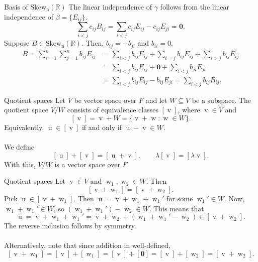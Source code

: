 \documentclass{beamer}
\def\Skew{\operatorname{Skew_n(\mathbb{R})}}
\def\u{\operatorname{u}}
\def\v{\operatorname{v}}
\def\w{\operatorname{w}}
\begin{document}
        \begin{frame}{Basis of $\Skew$}
                The linear independence of $\gamma$ follows from the linear independence of $\beta = \{E_{ij}\}$.
                \[
                        \sum_{i < j} c_{ij}B_{ij} = \sum_{i < j} c_{ij} E_{ij} - c_{ij}E_{ji} = \mathbf{0}.
                \]
                \pause
                Suppose $B \in \Skew$. Then, $b_{ij} = -b_{ji}$ and $b_{ii} = 0$.
                \begin{align*}
                        B = \sum_{i = 1}^n \sum_{j = 1}^n b_{ij}E_{ij} 
                                &= \sum_{i < j} b_{ij}E_{ij} + \sum_{i = j}b_{ij}E_{ij} + \sum_{i > j} b_{ij}E_{ij} \\
                                &= \sum_{i < j} b_{ij}E_{ij} + \mathbf{0} + \sum_{i < j} b_{ji}E_{ji} \\
                                &= \sum_{i < j} b_{ij}E_{ij} - b_{ij}E_{ji} = \sum_{i < j} b_{ij}B_{ij}.
                \end{align*}
        \end{frame}

        \begin{frame}{Quotient spaces}
                Let $V$ be vector space over $F$ and let $W\subseteq V$ be a subspace.
                The quotient space $V/W$ consists of equivalence classes $[\v]$, where $\v \in V$ and
                \[
                        [\v] = \v + W = \{\v + \w\colon \w \in W\}.
                \]
                Equivalently, $\u \in [\v]$ if and only if $\u - \v \in W$. \\~\\
                \pause
                We define
                \[
                        [\u] + [\v] = [\u + \v], \qquad \lambda[\v] = [\lambda\v].
                \]
                With this, $V/W$ is a vector space over $F$.
        \end{frame}
        
        \begin{frame}{Quotient spaces}
                Let $\v \in V$ and $\w_1, \w_2 \in W$. Then
                \[
                        [\v + \w_1] = [\v + \w_2].
                \]
                Pick $\u \in [\v + \w_1]$. Then $\u = \v + \w_1 + \w_1'$ for some $\w_1' \in W$. Now, $\w_1 + \w_1' \in W$,
                so $(\w_1 + \w_1') - \w_2 \in W$. This means that
                \[
                        \u = \v + \w_1 + \w_1' = \v + \w_2 + (\w_1 + \w_1' - \w_2) \in [\v + \w_2].
                \]
                The reverse inclusion follows by symmetry. \\~\\
                \pause
                Alternatively, note that since addition in well-defined,
                \[
                        [\v + \w_1] = [\v] + [\w_1] = [\v] + [\mathbf{0}] = [\v] + [\w_2] = [\v + \w_2].
                \]
        \end{frame}
\end{document}
